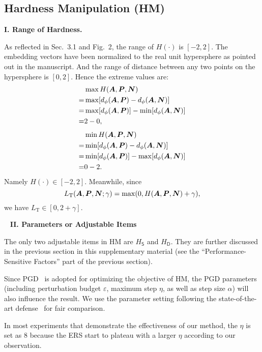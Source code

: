 \subsection{Hardness Manipulation (HM)}
\label{sec:b2}

\noindent\textbf{I. Range of Hardness.}

As reflected in Sec.~3.1 and Fig.~2, the range of $H(\cdot)$ is $[-2, 2]$.
%
The embedding vectors have been normalized to the real unit hypersphere
as pointed out in the manuscript.
%
And the range of distance between any two points on the hypersphere is
$[0,2]$.
%
Hence the extreme values are:
%
\begin{align}
	& \max H({\bm{A}}, {\bm{P}}, {\bm{N}})\\
	=& \max [d_\phi({\bm{A}}, {\bm{P}}) - d_\phi({\bm{A}}, {\bm{N}})]\\
	=& \max [d_\phi({\bm{A}}, {\bm{P}})] - \min [d_\phi({\bm{A}}, {\bm{N}})]\\
	=& 2 - 0,
\end{align}
%
\begin{align}
	& \min H({\bm{A}}, {\bm{P}}, {\bm{N}})\\
	=& \min [d_\phi({\bm{A}}, {\bm{P}}) - d_\phi({\bm{A}}, {\bm{N}})]\\
	=& \min [d_\phi({\bm{A}}, {\bm{P}})] - \max [d_\phi({\bm{A}}, {\bm{N}})]\\
	=& 0 - 2.
\end{align}
%
Namely $H(\cdot)\in[-2,2]$. Meanwhile, since
%
\begin{equation}
%
L_\text{T}(\mA, \mP, \mN; \gamma) = \max(0, H(\mA, \mP, \mN) + \gamma),
%
\end{equation}
%
we have $L_\text{T}\in[0, 2+\gamma]$.

~\newline
\noindent\textbf{II. Parameters or Adjustable Items}

The only two adjustable items in HM are $H_\mathsf{S}$ and $H_\mathsf{D}$.
%
They are further discussed in the previous section in this supplementary
material (see the ``Performance-Sensitive Factors'' part of the previous
section).

Since PGD~\cite{madry} is adopted for optimizing the objective of HM, the
PGD parameters (including perturbation budget $\varepsilon$, maximum step
$\eta$, as well as step size $\alpha$) will also influence the result.
%
We use the parameter setting following the state-of-the-art
defense~\cite{robrank} for fair comparison.

In most experiments that demonstrate the effectiveness of our method, the
$\eta$ is set as $8$ because the ERS start to plateau with a larger $\eta$
according to our observation.

